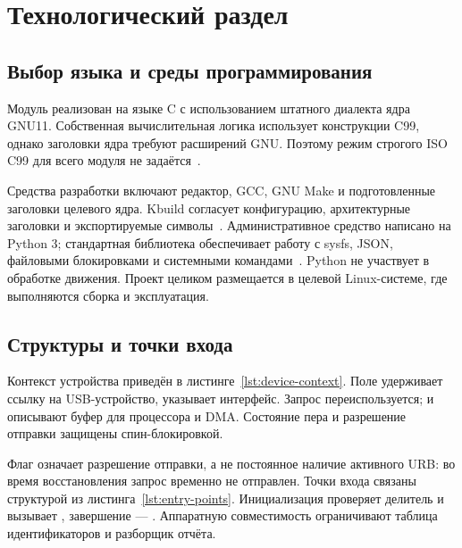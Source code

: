 \chapter{Технологический раздел}

\section{Выбор языка и среды программирования}

Модуль реализован на языке C с использованием штатного диалекта ядра GNU11. Собственная вычислительная логика использует конструкции C99, однако заголовки ядра требуют расширений GNU. Поэтому режим строгого ISO C99 для всего модуля не задаётся~\cite{kernellang,gcc}.

Средства разработки включают редактор, GCC, GNU Make и подготовленные заголовки целевого ядра. Kbuild согласует конфигурацию, архитектурные заголовки и экспортируемые символы~\cite{kbuild}. Административное средство написано на Python 3; стандартная библиотека обеспечивает работу с sysfs, JSON, файловыми блокировками и системными командами~\cite{python}. Python не участвует в обработке движения. Проект целиком размещается в целевой Linux-системе, где выполняются сборка и эксплуатация.

\section{Структуры и точки входа}

Контекст устройства приведён в листинге~\ref{lst:device-context}. Поле  удерживает ссылку на USB-устройство,  указывает интерфейс. Запрос  переиспользуется;  и  описывают буфер для процессора и DMA. Состояние пера и разрешение отправки защищены спин-блокировкой.

\par\noindent\begin{minipage}{\linewidth}

\end{minipage}\par

Флаг  означает разрешение отправки, а не постоянное наличие активного URB: во время восстановления запрос временно не отправлен. Точки входа связаны структурой из листинга~\ref{lst:entry-points}. Инициализация проверяет делитель и вызывает , завершение --- . Аппаратную совместимость ограничивают таблица идентификаторов и разборщик отчёта.

